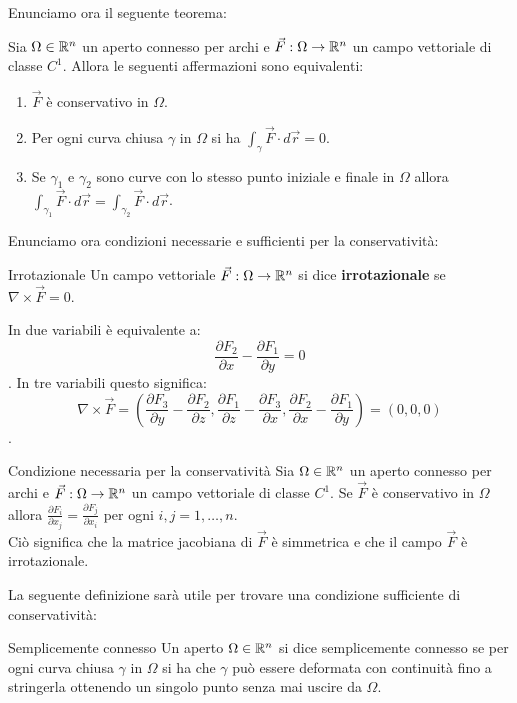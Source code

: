 Enunciamo ora il seguente teorema:
\begin{teorema}{}
  Sia $\Omega \in \mathbb{R}^n$ un aperto connesso per archi e $\vec F: \Omega \rightarrow \mathbb{R}^n$ un campo vettoriale di classe $C^1$. Allora le seguenti affermazioni sono equivalenti:
  \begin{enumerate}
    \item $\vec F$ è conservativo in $\Omega$.
    \item Per ogni curva chiusa $\gamma$ in $\Omega$ si ha $\int_\gamma \vec F \cdot d\vec r = 0$.
    \item Se $\gamma_1$ e $\gamma_2$ sono curve con lo stesso punto iniziale e finale in $\Omega$ allora $\int_{\gamma_1} \vec F \cdot d\vec r = \int_{\gamma_2} \vec F \cdot d\vec r$.
  \end{enumerate}
\end{teorema}

Enunciamo ora condizioni necessarie e sufficienti per la conservatività:


\begin{definizione}{Irrotazionale}
  Un campo vettoriale $\vec F: \Omega \rightarrow \mathbb{R}^n$ si dice \textbf{irrotazionale} se $\nabla \times \vec F = 0$. \\
\end{definizione}
In due variabili è equivalente a:
$$\frac{\partial F_2}{\partial x} - \frac{\partial F_1}{\partial y}=0$$.
In tre variabili questo significa:
$$\nabla \times \vec F = \left( \frac{\partial F_3}{\partial y} - \frac{\partial F_2}{\partial z}, \frac{\partial F_1}{\partial z} - \frac{\partial F_3}{\partial x}, \frac{\partial F_2}{\partial x} - \frac{\partial F_1}{\partial y} \right) = (0,0,0)$$.

\begin{teorema}{Condizione necessaria per la conservatività}
  Sia $\Omega \in \mathbb{R}^n$ un aperto connesso per archi e $\vec F: \Omega \rightarrow \mathbb{R}^n$ un campo vettoriale di classe $C^1$. Se $\vec F$ è conservativo in $\Omega$ allora $\frac{\partial F_i}{\partial x_j} = \frac{\partial F_j}{\partial x_i}$ per ogni $i,j = 1, \ldots, n$. \\
  Ciò significa che la matrice jacobiana di $\vec F$ è simmetrica e che il campo $\vec F$ è irrotazionale.
\end{teorema}

La seguente definizione sarà utile per trovare una condizione sufficiente di conservatività:

\begin{definizione}{Semplicemente connesso}
  Un aperto $\Omega \in \mathbb{R}^n$ si dice semplicemente connesso se per ogni curva chiusa $\gamma$ in $\Omega$ si ha che $\gamma$ può essere deformata con continuità fino a stringerla ottenendo un singolo punto senza mai uscire da $\Omega$.
\end{definizione}

